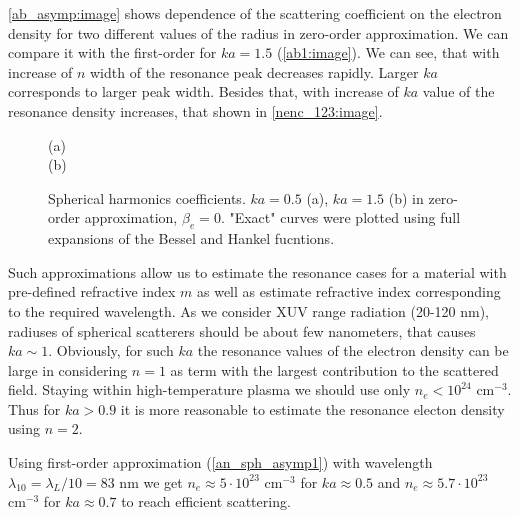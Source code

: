 \autoref{ab_asymp:image} shows dependence of the scattering coefficient on the electron density for two different values of the radius in zero-order approximation. We can compare it with the first-order for $ka = 1.5$ (\autoref{ab1:image}). We can see, that with increase of $n$ width of the resonance peak decreases rapidly. Larger $ka$ corresponds to larger peak width. Besides that, with increase of $ka$ value of the resonance density increases, that shown in \autoref{nenc_123:image}.

    \begin{figure}[H]
		(a)\: 
		\\ (b)\: 
		\caption{Spherical harmonics coefficients. $ka = 0.5$ (a), $ka = 1.5$ (b) in zero-order approximation, $\beta_e = 0$. "Exact" curves were plotted using full expansions of the Bessel and Hankel fucntions.}
		\label{ab_asymp:image}
	\end{figure}


Such approximations allow us to estimate the resonance cases for a material with pre-defined refractive index $m$ as well as estimate refractive index corresponding to the required wavelength. As we consider XUV range radiation (20-120 nm), radiuses of spherical scatterers should be about few nanometers, that causes $ka \sim 1$. Obviously, for such $ ka $ the resonance values of the electron density can be large in considering $n = 1$ as term with the largest contribution to the scattered field. Staying within high-temperature plasma we should use only $n_e < 10^{24}$ $\textrm{cm}^{-3}$. Thus for $ka > 0.9$ it is more reasonable to estimate the resonance electon density using $n = 2$.

Using first-order approximation (\ref{an_sph_asymp1}) with wavelength $\lambda_{10} = \lambda_{L} / 10 = 83$ nm we get $n_e \approx 5 \cdot 10^{23}$ $\textrm{cm}^{-3}$ for $ka \approx 0.5$ and $n_e \approx 5.7 \cdot 10^{23}$ $\textrm{cm}^{-3}$ for $ka \approx 0.7$ to reach efficient scattering.




